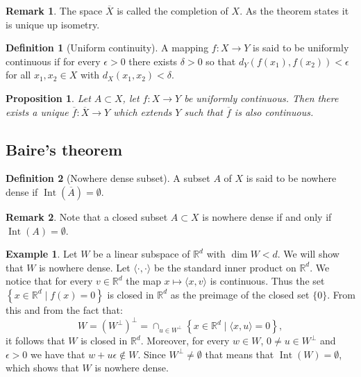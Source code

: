 \documentclass[11pt,a4paper]{article}
\theoremstyle{definition}
\newtheorem{definition}{Definition}[section]
\newtheorem{remark}{Remark}[section]
\newtheorem{example}{Example}[section]
\theoremstyle{plain}
\newtheorem{proposition}[theorem]{Proposition}
\DeclareMathOperator{\Int}{Int}
\newcommand{\R}{\mathbb{R}}
\newcommand{\ip}[2]{\langle #1, #2 \rangle}
\newcommand{\set}[2]{ \left\{ #1 \mid #2 \right\} }
\begin{document}
  \begin{remark}
    The space $\overline{X}$ is called the completion of $X$. As the theorem
    states it is unique up isometry.
  \end{remark}
  
  \begin{definition}[Uniform continuity]
    A mapping $f \colon X \to Y$ is said to be uniformly continuous if for
    every $\epsilon > 0$ there exists $\delta > 0$ so that 
    $d_Y(f(x_1),f(x_2)) < \epsilon$ for all $x_1,x_2 \in X$ with 
    $d_X(x_1,x_2) < \delta$.
  \end{definition}
  
  \begin{proposition}
    Let $A \subset X$, let $f \colon X \to Y$ be uniformly continuous.
    Then there exists a unique $\overline{f} \colon \overline{X} \to Y$ 
    which extends $Y$ such that $\overline{f}$ is also continuous.
  
  \end{proposition}
  
  \subsection{Baire's theorem}
  
  \begin{definition}[Nowhere dense subset]
    A subset $A$ of $X$ is said to be nowhere dense if 
    $\Int\left(\overline A\right) = \emptyset$.
  \end{definition}
  
  \begin{remark}
    Note that a closed subset $A \subset X$ is nowhere dense if and only if 
    $\Int(A) = \emptyset$.
  \end{remark}
  
  \begin{example}
    Let $W$ be a linear subspace of $\R^d$ with $\dim W < d$. We will show
    that $W$ is nowhere dense. Let $\ip{\cdot}{\cdot}$ be the standard
    inner product on $\R^d$. We notice that for every $v \in \R^d$ the
    map $x \mapsto \ip{x}{v}$ is continuous. Thus the set 
    $\set{x \in \R^d}{f(x) = 0}$ is closed in $\R^d$ as the preimage of the
    closed set $\{0\}$. From this and from the fact that:
    \[
      W = (W^{\perp})^{\perp} = \cap_{u \in W^{\perp}}{\set{x \in \R^d}
      {\ip{x}{u} = 0}},
    \]
    it follows that $W$ is closed in $\R^d$. Moreover, for every $w \in W$,
    $0 \neq u \in W^{\perp}$ and $\epsilon > 0$ we have that 
    $w+u\epsilon \notin W$. Since $W^{\perp} \neq \emptyset$ that means that
    $\Int(W) = \emptyset$, which shows that $W$ is nowhere dense.
  \end{example}
  
\end{document}
